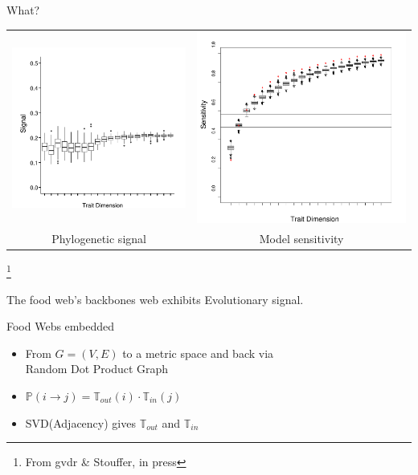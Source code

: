 \documentclass[]{beamer}
\begin{document}
\begin{frame}{What?}

\centering
\begin{tabular}{cc}
\includegraphics[width=0.47\linewidth]{images/psig.pdf} & \includegraphics[width=0.47 \linewidth]{images/sens.pdf}\\
{\tiny Phylogenetic signal} & {\tiny Model sensitivity}
\end{tabular}\footnote{From gvdr \& Stouffer, in press}

\centering
The food web's backbones web exhibits Evolutionary signal.

\end{frame}


\begin{frame}{Food Webs embedded}

\centering
\begin{itemize}[<+->]
\itemsep1pt\parskip0pt
\item
From $G=(V,E)$ to a metric space and back via\\
Random Dot Product Graph
\item
$\mathbb{P}\left( i \to j\right) = \mathbb{T}_{out}\left(i\right) \cdot  \mathbb{T}_{in}\left(j\right)$
\item
SVD(Adjacency) gives $\mathbb{T}_{out}$ and $ \mathbb{T}_{in}$
\end{itemize}

\end{frame}
\end{document}
